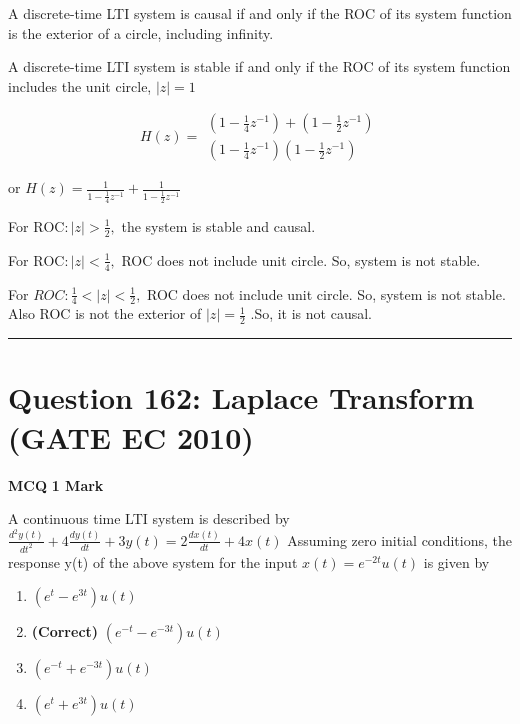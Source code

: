 \documentclass[11pt,a4paper]{article}
\begin{document}
\begin{tcolorbox}[solbox, title=Detailed Solution -- Question 161]
A discrete-time LTI system is causal if and
only if the ROC of its system function is the
exterior of a circle, including infinity. 

A discrete-time LTI system is stable if and only
if the ROC of its system function includes the
unit circle,  $|z|=1$

\[
H(z)=\begin{array}{l}\left(1-\frac{1}{4} z^{-1}\right)+\left(1-\frac{1}{2} z^{-1}\right) \\ \left(1-\frac{1}{4} z^{-1}\right)\left(1-\frac{1}{2} z^{-1}\right)\end{array}
\]

or  $H(z)=\frac{1}{1-\frac{1}{4} z^{-1}}+\frac{1}{1-\frac{1}{2} z^{-1}}$

For  $\mathrm{ROC}:|z| > \frac{1}{2},$ 
 the system is stable and
causal. 

For  $\mathrm{ROC}:|z| < \frac{1}{4},$
ROC  does not include unit
circle. So, system is not stable. 

For  $ROC: \frac{1}{4} < |z| < \frac{1}{2},$
 ROC  does not include
unit circle. So, system is not stable.
Also ROC  is not the exterior of  $|z|=\frac{1}{2}$ .So,  it is not causal.
\end{tcolorbox}

\vspace{1.5em}
\hrule
\vspace{1.5em}

\section*{Question 162: Laplace Transform (GATE EC 2010)}
\noindent \textbf{\color{primary}MCQ} \hfill \textbf{\color{secondary}1 Mark}


\noindent A continuous time LTI system is described by $\frac{d^{2}y(t)}{dt^{2}}+4\frac{dy(t)}{dt}+3y(t)=2\frac{dx(t)}{dt}+4x(t)$ 
Assuming zero initial conditions, the response y(t) of the above system for the input $x(t)=e^{-2t}u(t)$ is given by


\begin{enumerate}[label=(\Alph*)]
    \item $(e^{t}-e^{3t})u(t)$
    \item \textbf{(Correct)} $(e^{-t}-e^{-3t})u(t)$
    \item $(e^{-t}+e^{-3t})u(t)$
    \item $(e^{t}+e^{3t})u(t)$
\end{enumerate}
\end{document}
